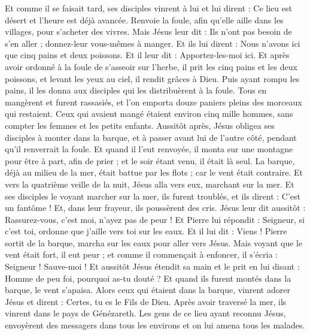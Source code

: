 \begin{multicols}{2}
Et comme il se faisait tard, ses disciples vinrent à lui et lui dirent : Ce lieu est désert et l'heure est déjà avancée. Renvoie la foule, afin qu'elle aille dans les villages, pour s’acheter des vivres.
Mais Jésus leur dit : Ils n'ont pas besoin de s'en aller ; donnez-leur vous-mêmes à manger.
Et ils lui dirent : Nous n'avons ici que cinq pains et deux poissons.
Et il leur dit : Apportez-les-moi ici.
Et après avoir ordonné à la foule de s'asseoir sur l'herbe, il prit les cinq pains et les deux poissons, et levant les yeux au ciel, il rendit grâces à Dieu. Puis ayant rompu les pains, il les donna aux disciples qui les distribuèrent à la foule.
Tous en mangèrent et furent rassasiés, et l’on emporta douze paniers pleins des morceaux qui restaient.
Ceux qui avaient mangé étaient environ cinq mille hommes, sans compter les femmes et les petits enfants.
Aussitôt après, Jésus obligea ses disciples à monter dans la barque, et à passer avant lui de l'autre côté, pendant qu'il renverrait la foule.
Et quand il l’eut renvoyée, il monta sur une montagne pour être à part, afin de prier ; et le soir étant venu, il était là seul.
La barque, déjà au milieu de la mer, était battue par les flots ; car le vent était contraire.
Et vers la quatrième veille de la nuit, Jésus alla vers eux, marchant sur la mer.
Et ses disciples le voyant marcher sur la mer, ils furent troublés, et ils dirent : C’est un fantôme ! Et, dans leur frayeur, ils poussèrent des cris.
Jésus leur dit aussitôt : Rassurez-vous, c'est moi, n'ayez pas de peur !
Et Pierre lui répondit : Seigneur, si c'est toi, ordonne que j'aille vers toi sur les eaux.
Et il lui dit : Viens ! Pierre sortit de la barque, marcha sur les eaux pour aller vers Jésus.
Mais voyant que le vent était fort, il eut peur ; et comme il commençait à enfoncer, il s'écria : Seigneur ! Sauve-moi !
Et aussitôt Jésus étendit sa main et le prit en lui disant : Homme de peu foi, pourquoi as-tu douté ?
Et quand ils furent montés dans la barque, le vent s'apaisa.
Alors ceux qui étaient dans la barque, vinrent adorer Jésus et dirent : Certes, tu es le Fils de Dieu.
Après avoir traversé la mer, ils vinrent dans le pays de Génézareth.
Les gens de ce lieu ayant reconnu Jésus, envoyèrent des messagers dans tous les environs et on lui amena tous les malades.

\end{multicols}
